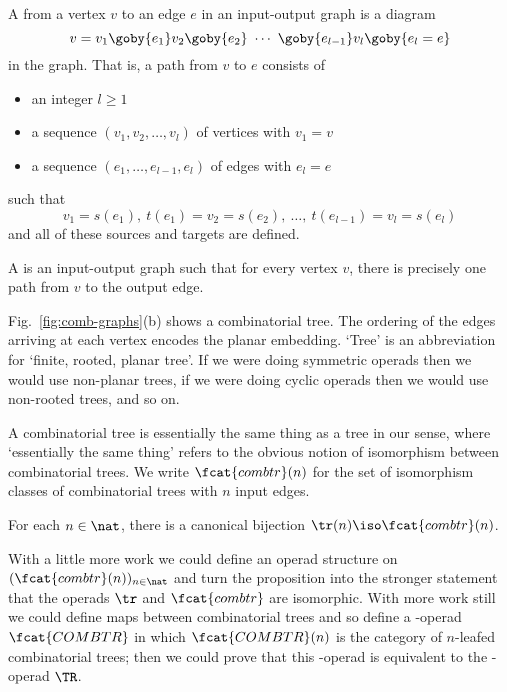 \begin{defn}
A %
%
%
from a vertex $v$ to an edge $e$ in an input-output graph is
a diagram
\[
v= v_1 \goby{e_1} v_2 \goby{e_2} 
\ \cdots \ 
\goby{e_{l-1}} v_l \goby{e_l = e}
\]
in the graph.  That is, a path from $v$ to $e$ consists of
%
\begin{itemize}
\item an integer $l\geq 1$
\item a sequence $(v_1, v_2, \ldots, v_l)$ of vertices with $v_1=v$
\item a sequence $(e_1, \ldots, e_{l-1}, e_l)$ of edges with $e_l=e$
\end{itemize}
%
such that
\[
v_1 = s(e_1), \ 
t(e_1) = v_2 = s(e_2), \ 
\ldots, \ 
t(e_{l-1}) = v_l = s(e_l)
\]
and all of these sources and targets are defined.
\end{defn}

\begin{defn}
A \demph{combinatorial tree}%
%
%
is an input-output graph such that for every
vertex $v$, there is precisely one path from $v$ to the output edge.
\end{defn}
%
Fig.~\ref{fig:comb-graphs}(b) shows a combinatorial tree.  The ordering of
the edges arriving at each vertex encodes the planar embedding.  `Tree' is
an abbreviation for `finite, rooted,%
%
\index{root of tree}
%
planar tree'.  If we were doing
symmetric operads then we would use non-planar trees, if we were doing
cyclic operads then we would use non-rooted trees, and so on.

A combinatorial tree is essentially the same thing as a tree in our sense,
where `essentially the same thing' refers to the obvious notion of
isomorphism between combinatorial trees.  We write $\fcat{combtr}(n)$ for
the set of isomorphism classes of combinatorial trees with $n$ input edges.

\begin{propn}
For each $n\in\nat$, there is a canonical bijection $\tr(n) \iso
\fcat{combtr}(n)$. 
\end{propn}

With a little more work we could define an operad structure on
$(\fcat{combtr}(n))_{n\in\nat}$ and turn the proposition into the stronger
statement that the operads $\tr$ and $\fcat{combtr}$ are isomorphic.  With
more work still we could define maps between combinatorial trees and
so define a \Cat-operad $\fcat{COMBTR}$ in which $\fcat{COMBTR}(n)$ is the
category of $n$-leafed combinatorial trees; then we could prove that this
\Cat-operad is equivalent to the \Cat-operad $\TR$.

